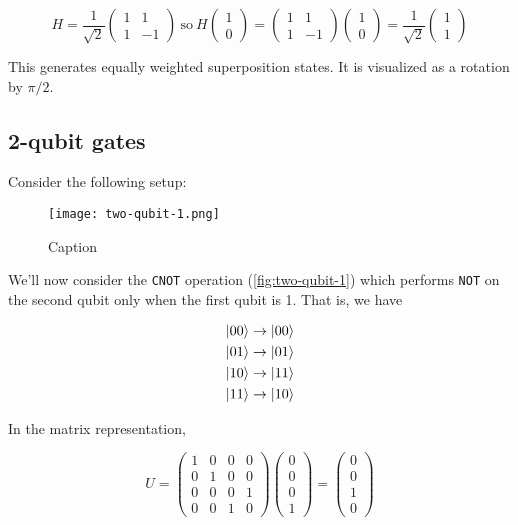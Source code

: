 \documentclass[12pt, english]{book}
\begin{document}
\[ H = \frac{1}{\sqrt{2}} \begin{pmatrix} 1 & 1 \\ 1 & -1 \end{pmatrix}\ \text{so}\ H \begin{pmatrix} 1 \\ 0 \end{pmatrix} = \begin{pmatrix} 1 & 1 \\ 1 & -1 \end{pmatrix} \begin{pmatrix} 1 \\ 0 \end{pmatrix} = \frac{1}{\sqrt{2}} \begin{pmatrix} 1 \\ 1 \end{pmatrix} \]

This generates equally weighted superposition states.
It is visualized as a rotation by $\pi/2$.

\subsection{2-qubit gates}

Consider the following setup:

\begin{figure}[!ht]
	\centering
	\texttt{[image: two-qubit-1.png]}
	\caption{Caption}
	\label{fig:two-qubit-1}
\end{figure}

We'll now consider the \texttt{CNOT} operation (\autoref{fig:two-qubit-1}) which performs \texttt{NOT} on the second qubit only when the first qubit is 1.
That is, we have

\begin{align*}
	\ket{00} &\rightarrow \ket{00} \\
	\ket{01} &\rightarrow \ket{01} \\
	\ket{10} &\rightarrow \ket{11} \\
	\ket{11} &\rightarrow \ket{10} 
\end{align*}

In the matrix representation,

\[ U = \begin{pmatrix} 1 & 0 & 0 & 0 \\ 0 & 1 & 0 & 0 \\ 0 & 0 & 0 & 1 \\ 0 & 0 & 1 & 0 \end{pmatrix} \begin{pmatrix} 0 \\ 0 \\ 0 \\ 1 \end{pmatrix} = \begin{pmatrix} 0 \\ 0 \\ 1 \\ 0 \end{pmatrix} \]
\end{document}
